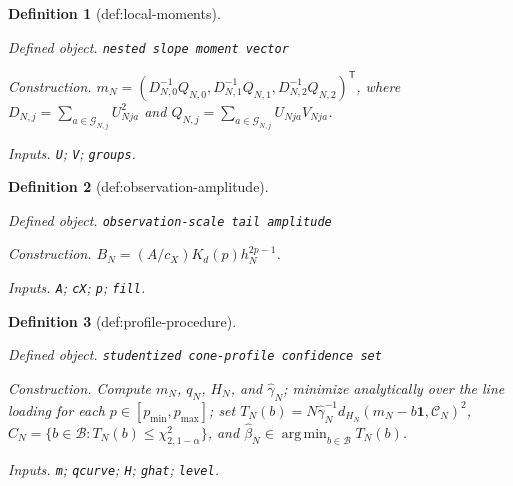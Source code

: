 \documentclass{article}
\newtheorem{definition}{Definition}
\begin{document}
\begin{definition}[def:local-moments]\label{def:local-moments}
\par\smallskip\noindent\emph{Defined object.} \texttt{nested slope moment vector}
\par\smallskip\noindent\emph{Construction.} \(m_N=(D_{N,0}^{-1}Q_{N,0},D_{N,1}^{-1}Q_{N,1},D_{N,2}^{-1}Q_{N,2})^{\mathsf T}\), where \(D_{N,j}=\sum_{a\in\mathcal G_{N,j}}U_{Nja}^2\) and \(Q_{N,j}=\sum_{a\in\mathcal G_{N,j}}U_{Nja}V_{Nja}\).
\par\smallskip\noindent\emph{Inputs.} \texttt{U}; \texttt{V}; \texttt{groups}.
\end{definition}

\begin{definition}[def:observation-amplitude]\label{def:observation-amplitude}
\par\smallskip\noindent\emph{Defined object.} \texttt{observation-\allowbreak{}scale tail amplitude}
\par\smallskip\noindent\emph{Construction.} \(B_N=(A/c_X)K_d(p)h_N^{2p-1}\).
\par\smallskip\noindent\emph{Inputs.} \texttt{A}; \texttt{cX}; \texttt{p}; \texttt{fill}.
\end{definition}

\begin{definition}[def:profile-procedure]\label{def:profile-procedure}
\par\smallskip\noindent\emph{Defined object.} \texttt{studentized cone-\allowbreak{}profile confidence set}
\par\smallskip\noindent\emph{Construction.} Compute \(m_N\), \(q_N\), \(H_N\), and \(\widehat\gamma_N\); minimize analytically over the line loading for each \(p\in[p_{\min},p_{\max}]\); set \(T_N(b)=N\widehat\gamma_N^{-1}d_{H_N}(m_N-b\mathbf 1,\mathcal C_N)^2\), \(C_N=\{b\in\mathcal B:T_N(b)\le\chi^2_{2,1-\alpha}\}\), and \(\widehat\beta_N\in\operatorname*{arg\,min}_{b\in\mathcal B}T_N(b)\).
\par\smallskip\noindent\emph{Inputs.} \texttt{m}; \texttt{qcurve}; \texttt{H}; \texttt{ghat}; \texttt{level}.
\end{definition}
\end{document}
